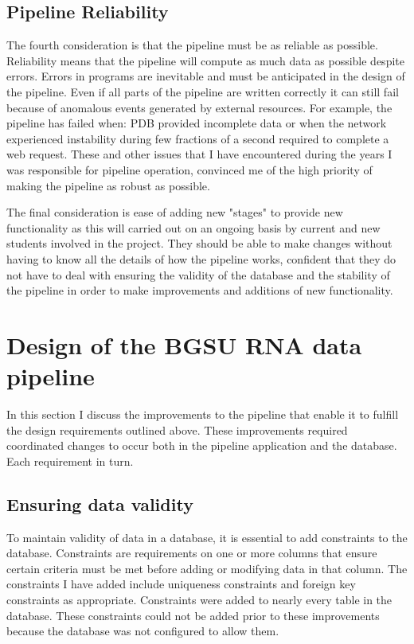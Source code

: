 \subsection{Pipeline Reliability}

The fourth consideration is that the pipeline must be as reliable as possible.
Reliability means that the pipeline will compute as much data as possible
despite errors. Errors in programs are inevitable and must be anticipated in the
design of the pipeline. Even if all parts of the pipeline are written correctly
it can still fail because of anomalous events generated by external resources.
For example, the pipeline has failed when:  PDB provided incomplete data or when
the network experienced instability during few fractions of a second required to
complete a web request. These and other issues that I have encountered during
the years I was responsible for pipeline operation, convinced me of the high
priority of making the pipeline as robust as possible.

The final consideration is ease of adding new "stages" to provide new
functionality as this will carried out on an ongoing basis by current and new
students involved in the project. They should be able to make changes without
having to know all the details of how the pipeline works, confident that they do
not have to deal with ensuring the validity of the database and the stability of
the pipeline in order to make improvements and additions of new functionality.

\section{Design of the BGSU RNA data pipeline}

In this section I discuss the improvements to the pipeline that enable it to
fulfill the design requirements outlined above. These improvements required
coordinated changes to occur both in the pipeline application and the database.
Each requirement in turn.

\subsection{Ensuring data validity}

To maintain validity of data in a database, it is essential to add constraints
to the database. Constraints are requirements on one or more columns that ensure
certain criteria must be met before adding or modifying data in that column. The
constraints I have added include uniqueness constraints and foreign key
constraints as appropriate. Constraints were added to  nearly every table in the
database. These constraints could not be added prior to these improvements
because the database was not configured to allow them.

